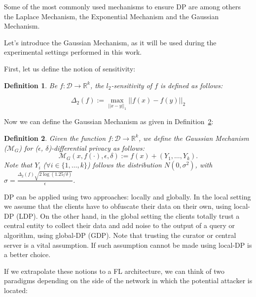 \documentclass[5p,times]{elsarticle}
\newtheorem{definition}{Definition}
\begin{document}
Some of the most commonly used mechanisms to ensure DP are  among others the Laplace Mechanism, the Exponential Mechanism and the Gaussian Mechanism. 

Let's introduce the Gaussian Mechanism, as it will be used during the experimental settings performed in this work.

First, let us define the notion of sensitivity:

\begin{definition}
Be $f:\mathcal{D} \longrightarrow \mathbb{R}^{k}$, the $l_{2}$-sensitivity of $f$ is defined as follows:

$$
\displaystyle
\Delta_{2}(f):= \max_{||x-y||_1}||f(x)-f(y)||_{2}
$$
\end{definition}

Now we can define the Gaussian Mechanism as given in Definition~\ref{def:gaussian}:
\begin{definition}\label{def:gaussian}
Given the function $f:\mathcal{D} \longrightarrow \mathbb{R}^{k}$, we define the Gaussian Mechanism ($\mathcal{M}_{G}$) for ($\epsilon$, $\delta$)-differential privacy as follows:
$$
\displaystyle
\mathcal{M}_{G}(x, f(\cdot), \epsilon, \delta):= f(x) + (Y_{1}, \hdots, Y_{k}).
$$
Note that $Y_{i}$ ($\forall i \in \{1, \hdots, k\}$) follows the distribution $N(0, \sigma^2)$, with $\sigma = \frac{\Delta_{2}(f) \sqrt{2\log(1.25/\delta)}}{\epsilon}$.
\end{definition}

DP can be applied using two approaches: locally and globally. In the local setting we assume that the clients have to obfuscate their data on their own, using  local-DP (LDP). On the other hand, in the global setting the clients totally trust a central entity to collect their data and add noise to the output of a query or algorithm, using global-DP (GDP). Note that trusting the curator or central server is a vital assumption. If such assumption cannot be made using local-DP is a better choice. 

If we extrapolate these notions to a FL architecture, we can think of two paradigms depending on the side of the network in which the potential attacker is located:
\end{document}
